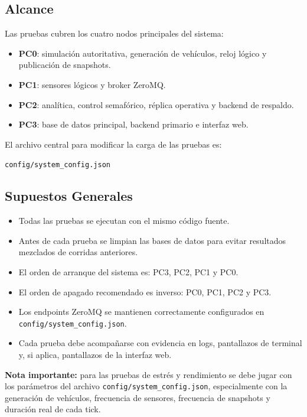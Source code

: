 \documentclass[12pt, a4paper]{article}
\begin{document}
\subsection{Alcance}

Las pruebas cubren los cuatro nodos principales del sistema:

\begin{itemize}
    \item \textbf{PC0}: simulación autoritativa, generación de vehículos, reloj lógico y publicación de snapshots.
    \item \textbf{PC1}: sensores lógicos y broker ZeroMQ.
    \item \textbf{PC2}: analítica, control semafórico, réplica operativa y backend de respaldo.
    \item \textbf{PC3}: base de datos principal, backend primario e interfaz web.
\end{itemize}

El archivo central para modificar la carga de las pruebas es:

\begin{center}
    \texttt{config/system\_config.json}
\end{center}

\subsection{Supuestos Generales}

\begin{itemize}
    \item Todas las pruebas se ejecutan con el mismo código fuente.
    \item Antes de cada prueba se limpian las bases de datos para evitar resultados mezclados de corridas anteriores.
    \item El orden de arranque del sistema es: PC3, PC2, PC1 y PC0.
    \item El orden de apagado recomendado es inverso: PC0, PC1, PC2 y PC3.
    \item Los endpoints ZeroMQ se mantienen correctamente configurados en \texttt{config/system\_config.json}.
    \item Cada prueba debe acompañarse con evidencia en logs, pantallazos de terminal y, si aplica, pantallazos de la interfaz web.
\end{itemize}

\begin{notabox}
\textbf{Nota importante:} para las pruebas de estrés y rendimiento se debe jugar con los parámetros del archivo \texttt{config/system\_config.json}, especialmente con la generación de vehículos, frecuencia de sensores, frecuencia de snapshots y duración real de cada tick.
\end{notabox}
\end{document}
